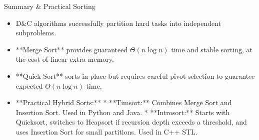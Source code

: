 \documentclass[aspectratio=169,xcolor=dvipsnames]{beamer}
\begin{document}
\begin{frame}{Summary \& Practical Sorting}
  \begin{itemize}
    \item D\&C algorithms successfully partition hard tasks into independent subproblems.
    \item **Merge Sort** provides guaranteed $\Theta(n \log n)$ time and stable sorting, at the cost of linear extra memory.
    \item **Quick Sort** sorts in-place but requires careful pivot selection to guarantee expected $\Theta(n \log n)$ time.
    \item **Practical Hybrid Sorts:**
      * **Timsort:** Combines Merge Sort and Insertion Sort. Used in Python and Java.
      * **Introsort:** Starts with Quicksort, switches to Heapsort if recursion depth exceeds a threshold, and uses Insertion Sort for small partitions. Used in C++ STL.
  \end{itemize}
\end{frame}
\end{document}
